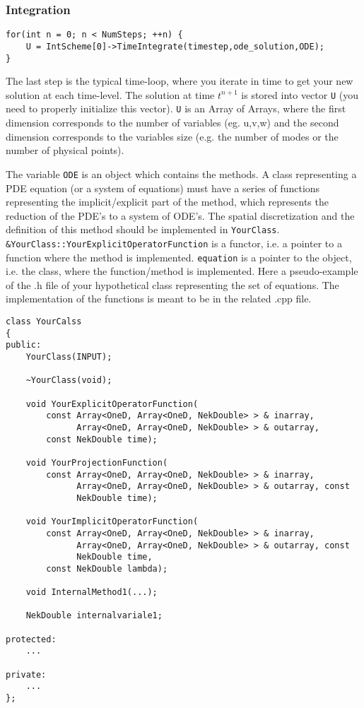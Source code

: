 \subsubsection{Integration}
\begin{lstlisting}[style=C++Style]
for(int n = 0; n < NumSteps; ++n) {
    U = IntScheme[0]->TimeIntegrate(timestep,ode_solution,ODE);
}
\end{lstlisting}
The last step is the typical time-loop, where you iterate in time to get
your new solution at each time-level.
The solution at time $t^{n+1}$ is stored into vector \texttt{U} (you need
to properly initialize this vector).
\texttt{U} is an Array of Arrays, where the first dimension corresponds to
the number of variables (eg. u,v,w) and the second dimension corresponds to the
variables size (e.g. the number of modes or the number of physical points).

The variable \texttt{ODE} is an object which contains the methods. A class
representing a PDE equation (or a system of equations) must have a series of
functions representing the implicit/explicit part of the method, which
represents the reduction of the PDE's to a system of ODE's.
The spatial discretization and the definition of this method should be
implemented in \texttt{YourClass}.
\texttt{\&YourClass::YourExplicitOperatorFunction} is a functor, i.e. a pointer
to a function where the method is implemented. \texttt{equation} is a pointer
to the object, i.e. the class, where the function/method is implemented.
Here a pseudo-example of the .h file of your hypothetical class representing the
set of equations.
The implementation of the functions is meant to be in the related .cpp file.

\begin{lstlisting}[style=C++Style]
class YourCalss
{ 
public:
    YourClass(INPUT);
    
    ~YourClass(void);

    void YourExplicitOperatorFunction(
        const Array<OneD, Array<OneD, NekDouble> > & inarray,
              Array<OneD, Array<OneD, NekDouble> > & outarray,
        const NekDouble time);

    void YourProjectionFunction(
        const Array<OneD, Array<OneD, NekDouble> > & inarray,
              Array<OneD, Array<OneD, NekDouble> > & outarray, const
              NekDouble time);

    void YourImplicitOperatorFunction(
        const Array<OneD, Array<OneD, NekDouble> > & inarray,
              Array<OneD, Array<OneD, NekDouble> > & outarray, const
              NekDouble time,
        const NekDouble lambda);
    
    void InternalMethod1(...);

    NekDouble internalvariale1;

protected:
    ...

private:
    ...
};
\end{lstlisting}


